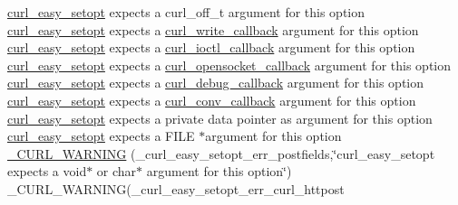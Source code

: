 \begin{DoxyCompactItemize}
\hyperlink{easy_8h_a7b171739b7bb728b3b58b2e6ec454aa0}{curl\+\_\+easy\+\_\+setopt} expects a curl\+\_\+off\+\_\+t argument for this option \hyperlink{easy_8h_a7b171739b7bb728b3b58b2e6ec454aa0}{curl\+\_\+easy\+\_\+setopt} expects a \hyperlink{curl_8h_ad65e62dcde45b356254b0f25f38dd802}{curl\+\_\+write\+\_\+callback} argument for this option \hyperlink{easy_8h_a7b171739b7bb728b3b58b2e6ec454aa0}{curl\+\_\+easy\+\_\+setopt} expects a \hyperlink{curl_8h_ae0524f6ec082005e39eb275c71c59a3b}{curl\+\_\+ioctl\+\_\+callback} argument for this option \hyperlink{easy_8h_a7b171739b7bb728b3b58b2e6ec454aa0}{curl\+\_\+easy\+\_\+setopt} expects a \hyperlink{curl_8h_a1b8b8f3e1a4e538a6bb1dd83a3388547}{curl\+\_\+opensocket\+\_\+callback} argument for this option \hyperlink{easy_8h_a7b171739b7bb728b3b58b2e6ec454aa0}{curl\+\_\+easy\+\_\+setopt} expects a \hyperlink{curl_8h_a50147c55283ee1fa3322b0d5aff2326c}{curl\+\_\+debug\+\_\+callback} argument for this option \hyperlink{easy_8h_a7b171739b7bb728b3b58b2e6ec454aa0}{curl\+\_\+easy\+\_\+setopt} expects a \hyperlink{curl_8h_acb230bf6dbf7bcb6e4e8740ea42ca3b3}{curl\+\_\+conv\+\_\+callback} argument for this option \hyperlink{easy_8h_a7b171739b7bb728b3b58b2e6ec454aa0}{curl\+\_\+easy\+\_\+setopt} expects a private data pointer as argument for this option \hyperlink{easy_8h_a7b171739b7bb728b3b58b2e6ec454aa0}{curl\+\_\+easy\+\_\+setopt} expects a F\+I\+L\+E $\ast$argument for this option \hyperlink{typecheck-gcc_8h_a0df309c29bbc3a1689b28d104fe9e3a0}{\+\_\+\+C\+U\+R\+L\+\_\+\+W\+A\+R\+N\+I\+N\+G} (\+\_\+curl\+\_\+easy\+\_\+setopt\+\_\+err\+\_\+postfields,\char`\"{}curl\+\_\+easy\+\_\+setopt expects a void$\ast$ or char$\ast$ argument for this option\char`\"{}) \+\_\+\+C\+U\+R\+L\+\_\+\+W\+A\+R\+N\+I\+N\+G(\+\_\+curl\+\_\+easy\+\_\+setopt\+\_\+err\+\_\+curl\+\_\+httpost
\item 

\end{DoxyCompactItemize}
